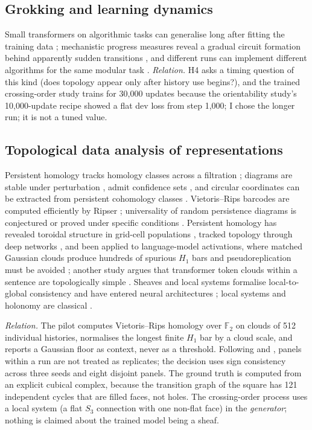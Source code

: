 \documentclass[11pt,a4paper]{article}
\DeclareRobustCommand{\_}{\ifmmode\origunderscore\else\textunderscore\allowbreak\fi}
\begin{document}
\subsection{Grokking and learning dynamics}
Small transformers on algorithmic tasks can generalise long after fitting the training data
\citep{power2022grokking}; mechanistic progress measures reveal a gradual circuit formation
behind apparently sudden transitions \citep{nanda2023progress}, and different runs can implement
different algorithms for the same modular task \citep{zhong2023clock}. \emph{Relation.} H4 asks a
timing question of this kind (does topology appear only after history use begins?), and the
trained crossing-order study trains for 30,000 updates because the orientability study's
10,000-update recipe showed a flat dev loss from step 1,000; I chose the longer run; it is not a
tuned value.

\subsection{Topological data analysis of representations}
Persistent homology tracks homology classes across a filtration
\citep{edelsbrunner2002persistence,zomorodian2005computing,carlsson2009topology}; diagrams are
stable under perturbation \citep{cohensteiner2007stability}, admit confidence sets
\citep{fasy2014confidence}, and circular coordinates can be extracted from persistent
cohomology classes \citep{desilva2011circular}. Vietoris--Rips barcodes are computed efficiently
by Ripser \citep{bauer2021ripser}; universality of random persistence diagrams is conjectured or
proved under specific conditions \citep{bobrowski2022universality}. Persistent homology has
revealed toroidal structure in grid-cell populations \citep{gardner2022toroidal}, tracked
topology through deep networks \citep{naitzat2020topology,rieck2019neural}, and been applied to
language-model activations, where matched Gaussian clouds produce hundreds of spurious $H_1$
bars and pseudoreplication must be avoided \citep{malhotra2026tracking}; another study argues
that transformer token clouds within a sentence are topologically simple \citep{fitz2026hidden}.
Sheaves and local systems formalise local-to-global consistency \citep{hansen2019sheaves} and
have entered neural architectures \citep{bodnar2022sheaf}; local systems and holonomy are
classical \citep{hatcher2002algebraic}.

\emph{Relation.} The pilot computes Vietoris--Rips homology over $\mathbb{F}_2$ on clouds of 512
individual histories, normalises the longest finite $H_1$ bar by a cloud scale, and reports a
Gaussian floor as context, never as a threshold. Following \citet{hurlbert1984pseudoreplication}
and \citet{malhotra2026tracking}, panels within a run are not treated as replicates; the decision
uses sign consistency across three seeds and eight disjoint panels. The ground truth is computed
from an explicit cubical complex, because the transition graph of the square has 121 independent
cycles that are filled faces, not holes. The crossing-order process uses a local system (a flat $S_3$ connection with one
non-flat face) in the \emph{generator}; nothing is claimed about the trained model being a sheaf.
\end{document}
